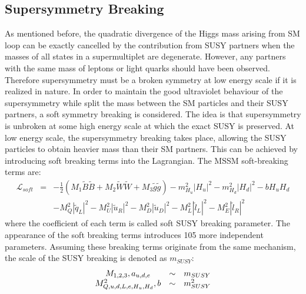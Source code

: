 \documentclass[thesis.tex]{subfiles}
\begin{document}
\subsection{Supersymmetry Breaking}
As mentioned before, the quadratic divergence of the Higgs mass arising from SM loop can be exactly cancelled by the contribution from SUSY partners when the masses of all states in a supermultiplet are degenerate. 
However, any partners with the same mass of leptons or light quarks should have been observed. 
Therefore supersymmetry must be a broken symmetry at low energy scale if it is realized in nature. 
In order to maintain the good ultraviolet behaviour of the supersymmetry while split the mass between the SM particles and their SUSY partners, a soft symmetry breaking is considered. 
The idea is that supersymmetry is unbroken at some high energy scale at which the exact SUSY is preserved. 
At low energy scale, the supersymmetry breaking takes place, allowing the SUSY particles to obtain heavier mass than their SM partners.
This can be achieved by introducing soft breaking terms into the Lagrangian. The MSSM soft-breaking terms are:
	\begin{equation}
	\begin{aligned}
		\mathcal{L}_{soft} &=& - \frac{1}{2} ( M_1 \tilde{B} \tilde{B} + M_2 \tilde{W} \tilde{W} + M_3 \tilde{g} \tilde{g} ) - m_{H_u}^2 |H_u|^2 - m_{H_d}^2 |H_d|^2 - bH_uH_d \\
			 &  &  - M_Q^2 |\tilde{q}_L |^2 - M_U^2 |\tilde{u}_R |^2  - M_D^2 |\tilde{u}_D |^2 - M_L^2 |\tilde{l}_L |^2 - M_E^2 |\tilde{l}_R |^2
	\end{aligned}
	\end{equation}      
where the coefficient of each term is called soft SUSY breaking parameter. 
The appearance of the soft breaking terms introduces 105 more independent parameters. 
Assuming these breaking terms originate from the same mechanism, the scale of the SUSY breaking is denoted as $m_{SUSY}$:
	\begin{equation}
		\begin{array}{c c c}
			M_{1,2,3}, a_{u,d,e} & \sim & m_{SUSY} \\
			M^2_{Q,u,d,L,e,H_u, H_d}, b & \sim & m^2_{SUSY}
		\end{array}
	\end{equation}
\end{document}
